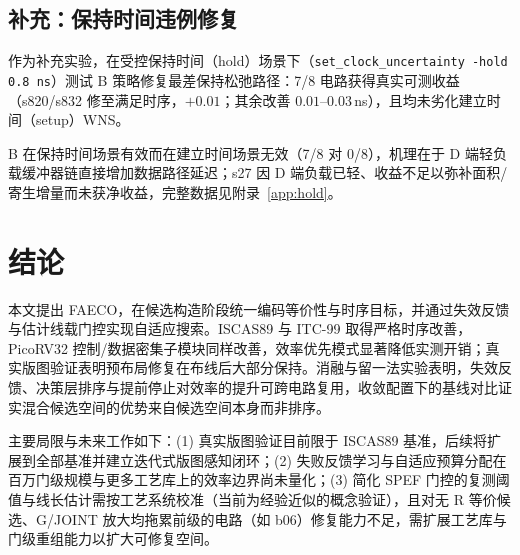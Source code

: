 \documentclass[journal]{IEEEtran}
\begin{document}
\subsection{补充：保持时间违例修复}\label{sec:hold}

作为补充实验，在受控保持时间（hold）场景下（\texttt{set\_clock\_uncertainty -hold 0.8\,ns}）测试 B 策略修复最差保持松弛路径：7/8 电路获得真实可测收益（s820/s832 修至满足时序，$+0.01$；其余改善 $0.01$--$0.03\,$ns），且均未劣化建立时间（setup）WNS。

B 在保持时间场景有效而在建立时间场景无效（7/8 对 0/8），机理在于 D 端轻负载缓冲器链直接增加数据路径延迟；s27 因 D 端负载已轻、收益不足以弥补面积/寄生增量而未获净收益，完整数据见附录~\ref{app:hold}。

\section{结论}\label{sec:conclusion}

本文提出 FAECO，在候选构造阶段统一编码等价性与时序目标，并通过失效反馈与估计线载门控实现自适应搜索。ISCAS89 与 ITC-99 取得严格时序改善，PicoRV32 控制/数据密集子模块同样改善，效率优先模式显著降低实测开销；真实版图验证表明预布局修复在布线后大部分保持。消融与留一法实验表明，失效反馈、决策层排序与提前停止对效率的提升可跨电路复用，收敛配置下的基线对比证实混合候选空间的优势来自候选空间本身而非排序。

主要局限与未来工作如下：(1) 真实版图验证目前限于 ISCAS89 基准，后续将扩展到全部基准并建立迭代式版图感知闭环；(2) 失败反馈学习与自适应预算分配在百万门级规模与更多工艺库上的效率边界尚未量化；(3) 简化 SPEF 门控的复测阈值与线长估计需按工艺系统校准（当前为经验近似的概念验证），且对无 R 等价候选、G/JOINT 放大均拖累前级的电路（如 b06）修复能力不足，需扩展工艺库与门级重组能力以扩大可修复空间。
\end{document}
